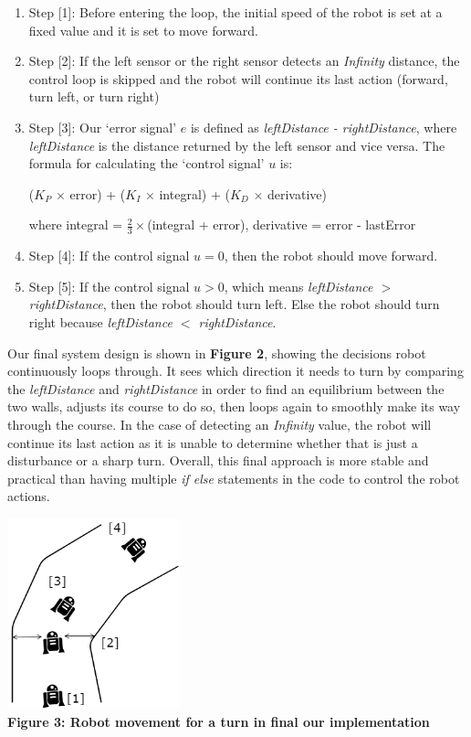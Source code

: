\documentclass[hidelinks,a4paper,11pt]{article}
\begin{document}
\begin{mdframed}
\begin{enumerate}
\item Step [1]: Before entering the loop, the initial speed of the robot is set at a fixed value and
it is set to move forward.
\item Step [2]: If the left sensor or the right sensor detects an \emph{Infinity} distance, the
control loop is skipped and the robot will continue its last action (forward, turn left, or turn
right)
\item Step [3]: Our `error signal' $e$ is defined as \emph{leftDistance - rightDistance}, where
\emph{leftDistance} is the distance returned by the left sensor and vice versa. The formula for
calculating the `control signal' $u$ is:
\begin{center}
($K_P$ $\times$ error) + ($K_I$ $\times$ integral) + ($K_D$ $\times$ derivative)
\end{center}
where integral = $\frac{2}{3} \times $(integral + error), derivative = error - lastError
\item Step [4]: If the control signal $u = 0$, then the robot should move forward.
\item Step [5]: If the control signal $u > 0$, which means \emph{leftDistance $>$ rightDistance},
then the robot should turn left. Else the robot should turn right because \emph{leftDistance $<$
rightDistance}.
\end{enumerate}

Our final system design is shown in \textbf{Figure 2}, showing the decisions robot continuously
loops through. It sees which direction it needs to turn by comparing the \emph{leftDistance} and
\emph{rightDistance} in order to find an equilibrium between the two walls, adjusts its course to do
so, then loops again to smoothly make its way through the course. In the case of detecting an
\emph{Infinity} value, the robot will continue its last action as it is unable to determine whether
that is just a disturbance or a sharp turn. Overall, this final approach is more stable and
practical than having multiple \emph{if else} statements in the code to control the robot actions.

\begin{center}
  \includegraphics[width=5cm]{final_illustration.png}\\
  \textbf{Figure 3: Robot movement for a turn in final our implementation}
\end{center}


\end{mdframed}
\end{document}
